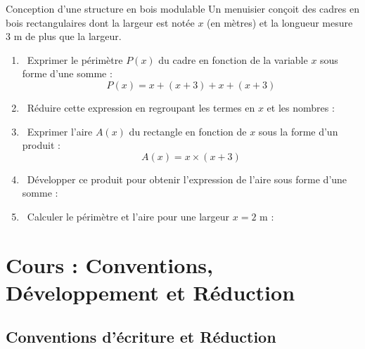 \begin{activite}{Conception d'une structure en bois modulable}
Un menuisier conçoit des cadres en bois rectangulaires dont la largeur est notée $x$ (en mètres) et la longueur mesure $3\text{ m}$ de plus que la largeur.

\begin{center}
\end{center}

\begin{enumerate}
    \item \capSApproprier\ Exprimer le périmètre $P(x)$ du cadre en fonction de la variable $x$ sous forme d'une somme :
    \[ P(x) = x + (x + 3) + x + (x + 3) \]
    \item \capRealiser\ Réduire cette expression en regroupant les termes en $x$ et les nombres :
    \lignesreponse[2]
    \item \capRealiser\ Exprimer l'aire $A(x)$ du rectangle en fonction de $x$ sous la forme d'un produit :
    \[ A(x) = x \times (x + 3) \]
    \item \capAnalyser\ Développer ce produit pour obtenir l'expression de l'aire sous forme d'une somme :
    \lignesreponse[2]
    \item \capValider\ Calculer le périmètre et l'aire pour une largeur $x = 2\text{ m}$ :
    \lignesreponse[2]
\end{enumerate}
\end{activite}

\section{Cours : Conventions, Développement et Réduction}

\subsection{Conventions d'écriture et Réduction}

